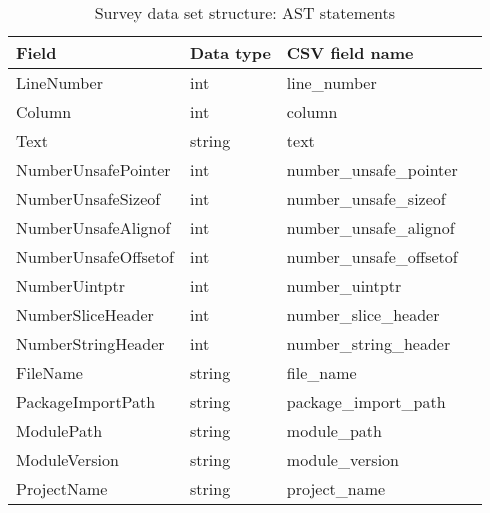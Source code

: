 \begin{table}[h]
    \centering
    \caption{Survey data set structure: AST statements}
    \label{tbl:datastructure-ast-statements}
    \begin{tabular}{llll}
        \toprule
        Field & Data type & CSV field name \\
        \midrule
        LineNumber           & int    & line\_number \\
        Column               & int    & column \\
        Text                 & string & text \\
        NumberUnsafePointer  & int    & number\_unsafe\_pointer \\
        NumberUnsafeSizeof   & int    & number\_unsafe\_sizeof \\
        NumberUnsafeAlignof  & int    & number\_unsafe\_alignof \\
        NumberUnsafeOffsetof & int    & number\_unsafe\_offsetof \\
        NumberUintptr        & int    & number\_uintptr \\
        NumberSliceHeader    & int    & number\_slice\_header \\
        NumberStringHeader   & int    & number\_string\_header \\
        FileName             & string & file\_name \\
        PackageImportPath    & string & package\_import\_path \\
        ModulePath           & string & module\_path \\
        ModuleVersion        & string & module\_version \\
        ProjectName          & string & project\_name \\
        \bottomrule
    \end{tabular}
\end{table}